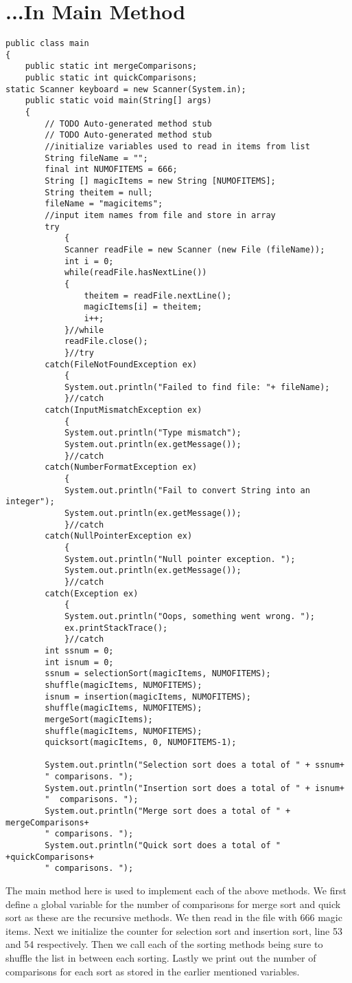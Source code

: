 \documentclass{article}
\begin{document}
\section{...In Main Method}
\begin{lstlisting}[frame =single,
backgroundcolor = \color{grey!12}]
public class main 
{
	public static int mergeComparisons;
	public static int quickComparisons; 
static Scanner keyboard = new Scanner(System.in);
	public static void main(String[] args) 
	{
		// TODO Auto-generated method stub
		// TODO Auto-generated method stub
		//initialize variables used to read in items from list
		String fileName = ""; 
		final int NUMOFITEMS = 666;
		String [] magicItems = new String [NUMOFITEMS];
		String theitem = null;
		fileName = "magicitems";
		//input item names from file and store in array
		try
			{
			Scanner readFile = new Scanner (new File (fileName));
			int i = 0; 
			while(readFile.hasNextLine())
			{
				theitem = readFile.nextLine();
				magicItems[i] = theitem;
				i++;
			}//while
			readFile.close();
			}//try
		catch(FileNotFoundException ex)
			{
			System.out.println("Failed to find file: "+ fileName);
			}//catch
		catch(InputMismatchException ex)
			{
			System.out.println("Type mismatch");
			System.out.println(ex.getMessage());
			}//catch
		catch(NumberFormatException ex)
			{
			System.out.println("Fail to convert String into an integer");
			System.out.println(ex.getMessage());
			}//catch
		catch(NullPointerException ex)
			{
			System.out.println("Null pointer exception. ");
			System.out.println(ex.getMessage());
			}//catch
		catch(Exception ex)
			{
			System.out.println("Oops, something went wrong. ");
			ex.printStackTrace();
			}//catch
		int ssnum = 0; 
		int isnum = 0;
		ssnum = selectionSort(magicItems, NUMOFITEMS);
		shuffle(magicItems, NUMOFITEMS);
		isnum = insertion(magicItems, NUMOFITEMS);
		shuffle(magicItems, NUMOFITEMS);
		mergeSort(magicItems);
		shuffle(magicItems, NUMOFITEMS);
		quicksort(magicItems, 0, NUMOFITEMS-1);
	   
	    System.out.println("Selection sort does a total of " + ssnum+ 
	    " comparisons. ");
	    System.out.println("Insertion sort does a total of " + isnum+ 
	    "  comparisons. ");
	    System.out.println("Merge sort does a total of " + mergeComparisons+ 
	    " comparisons. ");
	    System.out.println("Quick sort does a total of " +quickComparisons+ 
	    " comparisons. ");
\end{lstlisting}
\large
The main method here is used to implement each of the above methods. We first define a global variable for the number of comparisons for merge sort and quick sort as these are the recursive methods. We then read in the file with 666 magic items. Next we initialize the counter for selection sort and insertion sort, line 53 and 54 respectively. Then we call each of the sorting methods being sure to shuffle the list in between each sorting. Lastly we print out the number of comparisons for each sort as stored in the earlier mentioned variables. 
\end{document}
